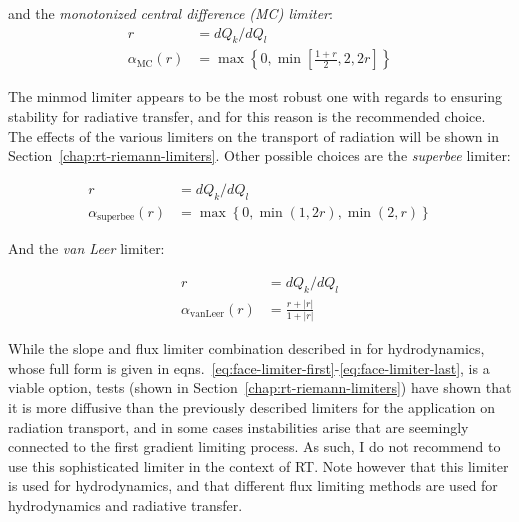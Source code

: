and the \emph{monotonized central difference (MC) limiter}:
\begin{align}
	r &= dQ_k / dQ_l \\
	\alpha_{\text{MC}}(r) &= \max \left\{ 0, \min\left[\frac{1 + r}{2}, 2, 2r \right] \right\}
	\label{eq:rt-MC}
\end{align}

The minmod limiter appears to be the most robust one with regards to ensuring stability for
radiative transfer, and for this reason is the recommended choice. The effects of the various
limiters on the transport of radiation will be shown in Section~\ref{chap:rt-riemann-limiters}.
Other possible choices are the \emph{superbee} limiter:

\begin{align}
	r &= dQ_k / dQ_l \\
	\alpha_{\text{superbee}}(r) &= \max \left\{0,  \min (1, 2r), \min(2, r) \right\}
	\label{eq:rt-superbee}
\end{align}


And the \emph{van Leer} limiter:

\begin{align}
	r &= dQ_k / dQ_l \\
	\alpha_{\text{vanLeer}}(r) &= \frac{r + |r|}{1 + |r|}
	\label{eq:rt-vanLeer}
\end{align}


While the slope and flux limiter combination described in \cite{hopkinsGIZMONewClass2015} for
hydrodynamics, whose full form is given in
eqns.~\ref{eq:face-limiter-first}-\ref{eq:face-limiter-last}, is a viable option, tests (shown in
Section~\ref{chap:rt-riemann-limiters}) have shown that it is more diffusive than the previously
described limiters for the application on radiation transport, and in some cases instabilities arise
that are seemingly connected to the first gradient limiting process. As such, I do not recommend to
use this sophisticated limiter in the context of RT. Note however that this limiter is used for
hydrodynamics, and that different flux limiting methods are used for hydrodynamics and radiative
transfer.


%
%
%
%
%
%
%





